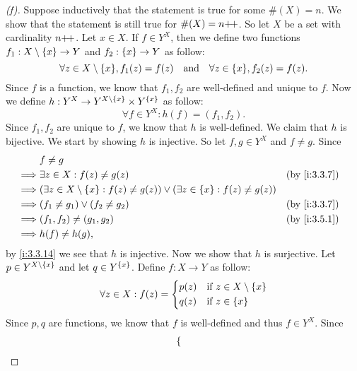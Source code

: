 \begin{proof}[(f)]
  Suppose inductively that the statement is true for some \(\#(X) = n\).
  We show that the statement is still true for \(\#(X) = n{+}\!{+}\).
  So let \(X\) be a set with cardinality \(n{+}\!{+}\).
  Let \(x \in X\).
  If \(f \in Y^X\), then we define two functions \(f_1 : X \setminus \left\lbrace x\right\rbrace \to Y\) and \(f_2 : \left\lbrace x\right\rbrace \to Y\) as follow:
  \[
    \forall z \in X \setminus \set{x}, f_1(z) = f(z) \quad \text{and} \quad \forall z \in \set{x}, f_2(z) = f(z).
  \]
  Since \(f\) is a function, we know that \(f_1, f_2\) are well-defined and unique to \(f\).
  Now we define \(h : Y^X \to Y^{X \setminus \left\lbrace x\right\rbrace} \times Y^{\left\lbrace x\right\rbrace}\) as follow:
  \[
    \forall f \in Y^X : h(f) = (f_1, f_2).
  \]
  Since \(f_1, f_2\) are unique to \(f\), we know that \(h\) is well-defined.
  We claim that \(h\) is bijective.
  We start by showing \(h\) is injective.
  So let \(f, g \in Y^X\) and \(f \neq g\).
  Since
  \begin{align*}
             & f \neq g                                                                                                             \\
    \implies & \exists z \in X : f(z) \neq g(z)                                                                   &  & \by{i:3.3.7} \\
    \implies & (\exists z \in X \setminus \set{x} : f(z) \neq g(z)) \lor (\exists z \in \set{x} : f(z) \neq g(z))                   \\
    \implies & (f_1 \neq g_1) \lor (f_2 \neq g_2)                                                                 &  & \by{i:3.3.7} \\
    \implies & (f_1, f_2) \neq (g_1, g_2)                                                                         &  & \by{i:3.5.1} \\
    \implies & h(f) \neq h(g),
  \end{align*}
  by \cref{i:3.3.14} we see that \(h\) is injective.
  Now we show that \(h\) is surjective.
  Let \(p \in Y^{X \setminus \left\lbrace x\right\rbrace}\) and let \(q \in Y^{\left\lbrace x\right\rbrace}\).
  Define \(f : X \to Y\) as follow:
  \[
    \forall z \in X : f(z) = \begin{dcases}
      p(z) & \text{if } z \in X \setminus \left\lbrace x\right\rbrace \\
      q(z) & \text{if } z \in \left\lbrace x\right\rbrace
    \end{dcases}
  \]
  Since \(p, q\) are functions, we know that \(f\) is well-defined and thus \(f \in Y^X\).
  Since
  \begin{align*}
             & \begin{dcases}

\end{dcases}
\end{align*}
\end{proof}
